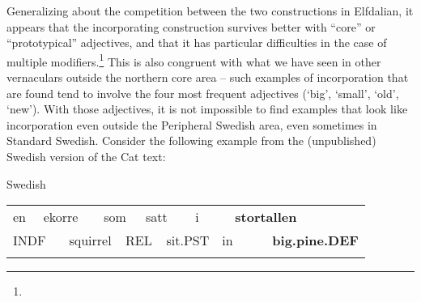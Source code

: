 \begin{styleBodytextC}
Generalizing about the competition between the two constructions in Elfdalian, it appears that the incorporating construction survives better with “core” or “prototypical” adjectives, and that it has particular difficulties in the case of multiple modifiers.\footnote{} This is also congruent with what we have seen in other vernaculars outside the northern core area – such examples of incorporation that are found tend to involve the four most frequent adjectives (‘big’, ‘small’, ‘old’, ‘new’). With those adjectives, it is not impossible to find examples that look like incorporation even outside the Peripheral Swedish area, even sometimes in Standard Swedish. Consider the following example from the (unpublished) Swedish version of the Cat text:

\end{styleBodytextC}

\begin{listWWNumileveli}
\item 

\begin{styleExample}
Swedish

\end{styleExample}

\end{listWWNumileveli}

\begin{styleExText}

\end{styleExText}

\begin{tabular}{llllllllllll}
\lsptoprule
en & \multicolumn{2}{l}{ekorre

} & \multicolumn{2}{l}{som

} & \multicolumn{2}{l}{satt

} & \multicolumn{2}{l}{i

} & \multicolumn{2}{l}{{\bfseries stortallen}

} & \\
\multicolumn{2}{l}{INDF

} & \multicolumn{2}{l}{squirrel

} & \multicolumn{2}{l}{REL

} & \multicolumn{2}{l}{sit.PST

} & \multicolumn{2}{l}{in

} & \multicolumn{2}{l}{{\bfseries big.pine.DEF}

}\\
\lspbottomrule
\end{tabular}

